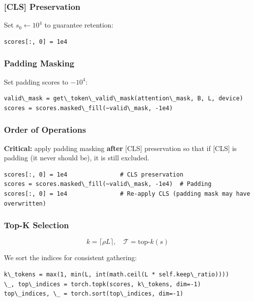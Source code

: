 \subsubsection{[CLS] Preservation}

Set $s_0 \leftarrow 10^4$ to guarantee retention:

\begin{lstlisting}
scores[:, 0] = 1e4
\end{lstlisting}

\subsubsection{Padding Masking}

Set padding scores to $-10^4$:

\begin{lstlisting}
valid\_mask = get\_token\_valid\_mask(attention\_mask, B, L, device)
scores = scores.masked\_fill(~valid\_mask, -1e4)
\end{lstlisting}

\subsubsection{Order of Operations}

\textbf{Critical:} apply padding masking \textbf{after} [CLS] preservation so that 
if [CLS] is padding (it never should be), it is still excluded.

\begin{lstlisting}
scores[:, 0] = 1e4               # CLS preservation
scores = scores.masked\_fill(~valid\_mask, -1e4)  # Padding
scores[:, 0] = 1e4               # Re-apply CLS (padding mask may have overwritten)
\end{lstlisting}

\subsubsection{Top-K Selection}

\[
k = \lceil \rho L \rceil, \quad
\mathcal{T} = \text{top-}k(s)
\tag{4.2}
\]

We sort the indices for consistent gathering:

\begin{lstlisting}
k\_tokens = max(1, min(L, int(math.ceil(L * self.keep\_ratio))))
\_, top\_indices = torch.topk(scores, k\_tokens, dim=-1)
top\_indices, \_ = torch.sort(top\_indices, dim=-1)
\end{lstlisting}

